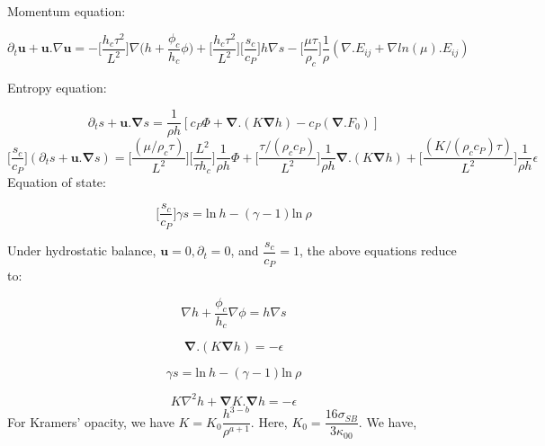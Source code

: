 \documentclass{aastex631}
\newcommand{\del}{\nabla}
\renewcommand{\vec}{\boldsymbol}
\newcommand{\grad}{\vec{\del}}
\begin{document}
Momentum equation:

\begin{equation}
    \partial_t \vec{u} + \vec{u}.\del \vec{u} = -\Bigg[\dfrac{h_{c}\tau^{2}}{L^{2}}\Bigg] \del \Bigg(h+\dfrac{\phi_c}{h_{c}}\phi \Bigg) +  \Bigg[\dfrac{h_{c}\tau^{2}}{L^{2}}\Bigg] \Bigg[ \dfrac{s_{c}}{c_{P}} \Bigg] h \del s - \Bigg[\dfrac{\mu \tau}{\rho_{c}} \Bigg] \dfrac{1}{\rho} (\del.E_{ij} + \del ln(\mu).E_{ij})
\end{equation}


Entropy equation:

\begin{equation}
    \partial_t s + \vec{u}.\grad s = \dfrac{1}{\rho h}[c_{P}\Phi + \grad . (K \grad h) - c_{P}(\grad . F_{0}) ]
\end{equation}
\begin{equation}
    \Bigg[\dfrac{s_{c}}{c_{P}}\Bigg] (\partial_t s + \vec{u}.\grad s) = \Bigg[\dfrac{(\mu/\rho_{c}\tau)}{L^{2}} \Bigg] \Bigg[\dfrac{L^{2}}{\tau h_{c}}\Bigg] \dfrac{1}{\rho h} \Phi + \Bigg[\dfrac{\tau/(\rho_{c}c_{P})}{L^{2}} \Bigg]\dfrac{1}{\rho h} \grad.(K\grad h) + \Bigg[\dfrac{(K/(\rho_c c_{P})\tau)}{L^{2}} \Bigg] \dfrac{1}{\rho h} \epsilon
\end{equation}
Equation of state:

\begin{equation}
    \Bigg[\dfrac{s_{c}}{c_{P}} \Bigg] \gamma s = \text{ln}~h - (\gamma-1)\text{ln}~\rho
\end{equation}

Under hydrostatic balance, $\vec{u}=0, \partial_t = 0$, and $\dfrac{s_{c}}{c_{P}}=1$, the above equations reduce to:

\begin{equation}
    \del h + \dfrac{\phi_c}{h_{c}} \del \phi = h\del s
\end{equation}

\begin{equation}
    \grad.(K\grad h) = -\epsilon
\end{equation}

\begin{equation}
    \gamma s = \text{ln}~h - (\gamma-1)\text{ln}~\rho
\end{equation}

\begin{equation}
    K \del^{2}h + \grad K.\grad h = -\epsilon
\end{equation}
For Kramers' opacity, we have $K=K_{0} \dfrac{h^{3-b}}{\rho^{a+1}}$. Here, $K_{0}=\dfrac{16\sigma_{SB}}{3\kappa_{00}}$. We have, 
\end{document}
